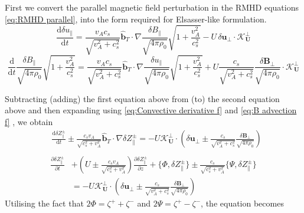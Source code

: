 First we convert the parallel magnetic field perturbation in the RMHD equations \eqref{eq:RMHD parallel}, into the form required for Elsasser-like formulation.
\begin{equation*}
     \frac{\mathrm{d} \delta u_{\parallel}}{\mathrm{d} t}= \frac{v_Ac_s}{\sqrt{v_A^2 +c_s^2}}\hat{\boldsymbol{b}}_{T}  \cdot \nabla \frac{\delta B_{\parallel}}{\sqrt{4 \pi\rho_0}}\sqrt{1+\frac{v_A^2}{c_s^2}} -  U\,\delta \boldsymbol{u}_{\perp} \cdot \boldsymbol{\mathcal{K}^{\perp}_{U}}
\end{equation*}
\begin{equation*}
    \frac{\mathrm{d}}{\mathrm{d}t}  \frac{\delta B_{\parallel}}{\sqrt{4 \pi\rho_0}}\sqrt{1+\frac{v_A^2}{c_s^2}} = \frac{v_Ac_s}{\sqrt{v_A^2 +c_s^2}}\hat{\boldsymbol{b}}_{T}  \cdot \nabla \frac{\delta u_{\parallel}}{\sqrt{4 \pi\rho_0}}\sqrt{1+\frac{v_A^2}{c_s^2}} + U \frac{c_s}{\sqrt{v_A^2 +c_s^2}}\frac{\delta \boldsymbol{B}_{\perp}}{\sqrt{4 \pi\rho_0}} \cdot \boldsymbol{\mathcal{K}^{\perp}_{U}}
\end{equation*}

Subtracting (adding) the first equation above from (to) the second equation above and then expanding using \eqref{eq:Convective derivative f} and \eqref{eq:B advection f} , we obtain 
\begin{equation*}
    \begin{split}
    &\frac{\mathrm{d} \delta Z_{\parallel}^{\pm}}{\mathrm{d} t} \pm \frac{c_{s} v_{A}}{\sqrt{c_{s}^{2} + v_{A}^{2}}} \hat{\boldsymbol{b}}_{T}  \cdot \nabla \delta Z_{\parallel}^{\pm} = -U \boldsymbol{\mathcal{K}^{\perp}_{U}} \cdot\left( \delta \boldsymbol{u}_{\perp} \pm \frac{c_s}{\sqrt{v_A^2 +c_s^2}}\frac{\delta \boldsymbol{B}_{\perp}}{\sqrt{4 \pi\rho_0}}\right) \\
    \end{split}
\end{equation*}
\begin{equation*}
    \begin{split}
    \frac{\partial \delta Z_{\parallel}^{\pm}}{\partial t}
    & +\left(U\pm \frac{c_{s} v_{A}}{\sqrt{c_{s}^{2} + v_{A}^{2}}} \right)\frac{\partial \delta Z_{\parallel}^{\pm}}{\partial z} + \{\Phi,  \delta Z_{\parallel}^{\pm}\} \pm \frac{c_{s}}{\sqrt{c_{s}^{2} + v_{A}^{2}}}\{\Psi,  \delta Z_{\parallel}^{\pm}\}\\
    &= -U \boldsymbol{\mathcal{K}^{\perp}_{U}} \cdot\left( \delta \boldsymbol{u}_{\perp} \pm \frac{c_s}{\sqrt{v_A^2 +c_s^2}}\frac{\delta \boldsymbol{B}_{\perp}}{\sqrt{4 \pi\rho_0}}\right)
    \end{split}
\end{equation*}
Utilising the fact that \(2\Phi = \zeta^{+} + \zeta^{-}\) and \(2\Psi = \zeta^{+} - \zeta^{-}\), the equation becomes 

